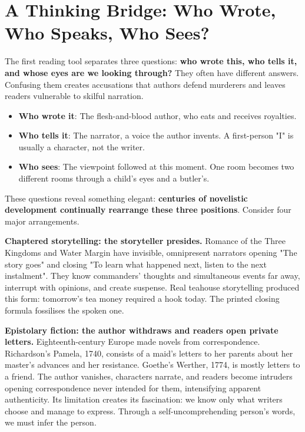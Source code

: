 \section[Thinking Bridge: Writer, Voice, View]{A Thinking Bridge: Who Wrote, Who Speaks, Who Sees?}
The first reading tool separates three questions: \textbf{who wrote this, who tells it, and whose eyes are we looking through?} They often have different answers. Confusing them creates accusations that authors defend murderers and leaves readers vulnerable to skilful narration.

\begin{itemize}
\item \textbf{Who wrote it}: The flesh-and-blood author, who eats and receives royalties.
\item \textbf{Who tells it}: The narrator, a voice the author invents. A first-person "I" is usually a character, not the writer.
\item \textbf{Who sees}: The viewpoint followed at this moment. One room becomes two different rooms through a child's eyes and a butler's.
\end{itemize}
These questions reveal something elegant: \textbf{centuries of novelistic development continually rearrange these three positions}. Consider four major arrangements.

\textbf{Chaptered storytelling: the storyteller presides.} Romance of the Three Kingdoms and Water Margin have invisible, omnipresent narrators opening "The story goes" and closing "To learn what happened next, listen to the next instalment". They know commanders' thoughts and simultaneous events far away, interrupt with opinions, and create suspense. Real teahouse storytelling produced this form: tomorrow's tea money required a hook today. The printed closing formula fossilises the spoken one.

\textbf{Epistolary fiction: the author withdraws and readers open private letters.} Eighteenth-century Europe made novels from correspondence. Richardson's Pamela, 1740, consists of a maid's letters to her parents about her master's advances and her resistance. Goethe's Werther, 1774, is mostly letters to a friend. The author vanishes, characters narrate, and readers become intruders opening correspondence never intended for them, intensifying apparent authenticity. Its limitation creates its fascination: we know only what writers choose and manage to express. Through a self-uncomprehending person's words, we must infer the person.


